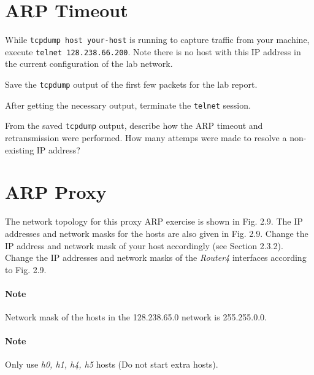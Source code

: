 \documentclass{../UTNetLab}
\begin{document}
\section{ARP Timeout}
    While \lstinline[emph={your-host}]{tcpdump host your-host} is running to capture traffic from your machine, execute \lstinline{telnet 128.238.66.200}.
    Note there is no host with this IP address in the current configuration of the lab network.

    Save the \lstinline{tcpdump} output of the first few packets for the lab report.

    After getting the necessary output, terminate the \lstinline{telnet} session.

    \begin{report}
    \item From the saved \lstinline{tcpdump} output, describe how the ARP timeout and retransmission were performed.
    How many attemps were made to resolve a non-existing IP address?
    \end{report}

\section{ARP Proxy}
    The network topology for this proxy ARP exercise is shown in Fig. 2.9. The IP addresses and network masks for the hosts are also given in Fig. 2.9. Change the IP address and network mask of your host accordingly (see Section 2.3.2). Change the IP addresses and network masks of the \textit{Router4} interfaces according to Fig. 2.9.

    \paragraph{Note} Network mask of the hosts in the 128.238.65.0 network is 255.255.0.0.
    \paragraph{Note} Only use \textit{h0, h1, h4, h5} hosts (Do not start extra hosts).\\
\end{document}
